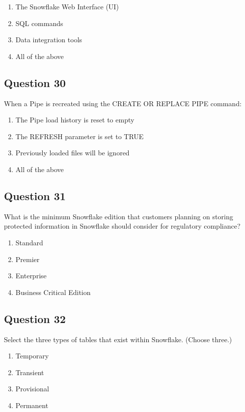 \documentclass[12pt]{article}
\begin{document}
\begin{enumerate}[label=\Alph*.]
  \item The Snowflake Web Interface (UI)
  \item SQL commands
  \item Data integration tools
  \item All of the above
\end{enumerate}

\subsection*{Question 30}
When a Pipe is recreated using the CREATE OR REPLACE PIPE command:

\begin{enumerate}[label=\Alph*.]
  \item The Pipe load history is reset to empty
  \item The REFRESH parameter is set to TRUE
  \item Previously loaded files will be ignored
  \item All of the above
\end{enumerate}

\subsection*{Question 31}
What is the minimum Snowflake edition that customers planning on storing protected information in Snowflake should consider for regulatory compliance?

\begin{enumerate}[label=\Alph*.]
  \item Standard
  \item Premier
  \item Enterprise
  \item Business Critical Edition
\end{enumerate}

\subsection*{Question 32}
Select the three types of tables that exist within Snowflake. (Choose three.)

\begin{enumerate}[label=\Alph*.]
  \item Temporary
  \item Transient
  \item Provisional
  \item Permanent
\end{enumerate}
\end{document}

